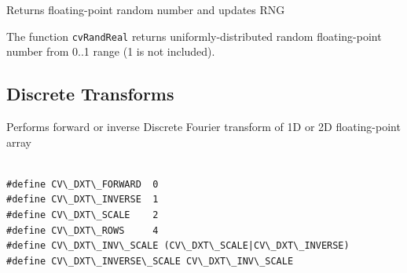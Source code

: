 \label{RandReal}

Returns floating-point random number and updates RNG


\begin{description}
\end{description}


The function \texttt{cvRandReal} returns uniformly-distributed random floating-point number from 0..1 range (1 is not included).

\subsection{Discrete Transforms}

\label{DFT}

Performs forward or inverse Discrete Fourier transform of 1D or 2D floating-point array


\begin{lstlisting}

#define CV\_DXT\_FORWARD  0
#define CV\_DXT\_INVERSE  1
#define CV\_DXT\_SCALE    2
#define CV\_DXT\_ROWS     4
#define CV\_DXT\_INV\_SCALE (CV\_DXT\_SCALE|CV\_DXT\_INVERSE)
#define CV\_DXT\_INVERSE\_SCALE CV\_DXT\_INV\_SCALE

\end{lstlisting}

